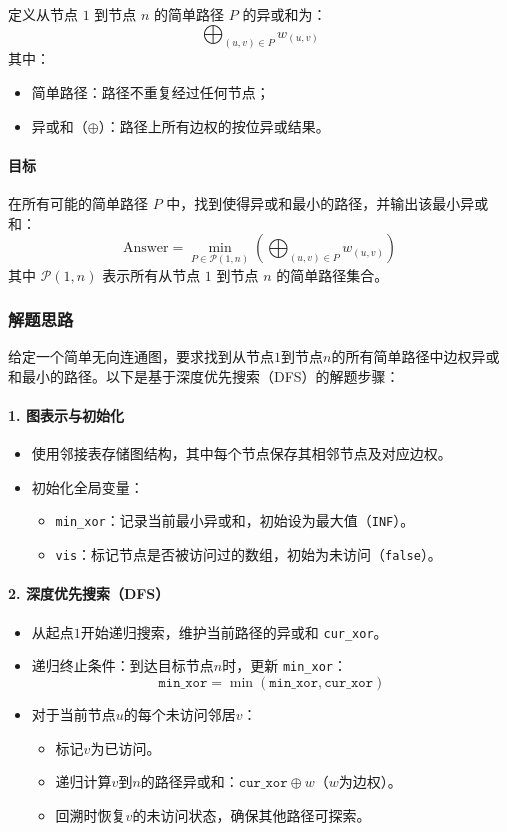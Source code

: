 \documentclass[../mainReport.tex]{subfiles}
\begin{document}
定义从节点 $ 1 $ 到节点 $ n $ 的简单路径 $ P $ 的异或和为：
$$
\bigoplus_{(u,v) \in P} w_{(u,v)}
$$
其中：
\begin{itemize}
    \item 简单路径：路径不重复经过任何节点；
    \item 异或和（$\oplus$）：路径上所有边权的按位异或结果。
\end{itemize}

\paragraph{目标}
在所有可能的简单路径 $ P $ 中，找到使得异或和最小的路径，并输出该最小异或和：
$$
\text{Answer} = \min_{P \in \mathcal{P}(1, n)} \left( \bigoplus_{(u,v) \in P} w_{(u,v)} \right)
$$
其中 $ \mathcal{P}(1, n) $ 表示所有从节点 $ 1 $ 到节点 $ n $ 的简单路径集合。

\subsubsection{解题思路}
给定一个简单无向连通图，要求找到从节点$1$到节点$n$的所有简单路径中边权异或和最小的路径。以下是基于深度优先搜索（DFS）的解题步骤：

\paragraph{1. 图表示与初始化}
\begin{itemize}
    \item 使用邻接表存储图结构，其中每个节点保存其相邻节点及对应边权。
    \item 初始化全局变量：
        \begin{itemize}
            \item \texttt{min\_xor}：记录当前最小异或和，初始设为最大值（\texttt{INF}）。
            \item \texttt{vis}：标记节点是否被访问过的数组，初始为未访问（\texttt{false}）。
        \end{itemize}
\end{itemize}

\paragraph{2. 深度优先搜索（DFS）}
\begin{itemize}
    \item 从起点$1$开始递归搜索，维护当前路径的异或和 \texttt{cur\_xor}。
    \item 递归终止条件：到达目标节点$n$时，更新 \texttt{min\_xor}：
        $$
        \texttt{min\_xor} = \min(\texttt{min\_xor}, \texttt{cur\_xor})
        $$
    \item 对于当前节点$u$的每个未访问邻居$v$：
        \begin{itemize}
            \item 标记$v$为已访问。
            \item 递归计算$v$到$n$的路径异或和：$\texttt{cur\_xor} \oplus w$（$w$为边权）。
            \item 回溯时恢复$v$的未访问状态，确保其他路径可探索。
        \end{itemize}
\end{itemize}
\end{document}
